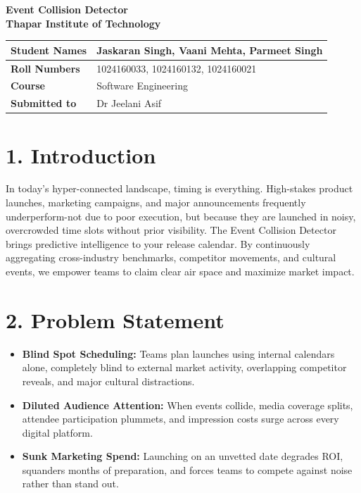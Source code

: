 \documentclass[12pt]{article}
\begin{document}
\begin{center}
    \LARGE\textbf{Event Collision Detector} \\
    \vspace{0.5em}
    \Large\textbf{Thapar Institute of Technology}
\end{center}
\vspace{1.5em}

\renewcommand{\arraystretch}{1.5}
\noindent
\begin{tabularx}{\textwidth}{|l|X|}
\hline
\textbf{Student Names} & Jaskaran Singh, Vaani  Mehta, Parmeet Singh \\
\hline
\textbf{Roll Numbers} & 1024160033, 1024160132, 1024160021  \\
\hline
\textbf{Course} & Software Engineering \\
\hline
\textbf{Submitted to} & Dr Jeelani Asif \\
\hline

\end{tabularx}

\vspace{2em}

\section*{1. Introduction}
In today’s hyper-connected landscape, timing is everything. High-stakes product launches, marketing campaigns, and major announcements frequently underperform-not due to poor execution, but because they are launched in noisy, overcrowded time slots without prior visibility. The Event Collision Detector brings predictive intelligence to your release calendar. By continuously aggregating cross-industry benchmarks, competitor movements, and cultural events, we empower teams to claim clear air space and maximize market impact.

\section*{2. Problem Statement}
\begin{itemize}[leftmargin=*]
    \item \textbf{Blind Spot Scheduling:} Teams plan launches using internal calendars alone, completely blind to external market activity, overlapping competitor reveals, and major cultural distractions.
    \item \textbf{Diluted Audience Attention:} When events collide, media coverage splits, attendee participation plummets, and impression costs surge across every digital platform.
    \item \textbf{Sunk Marketing Spend:} Launching on an unvetted date degrades ROI, squanders months of preparation, and forces teams to compete against noise rather than stand out.
\end{itemize}
\end{document}
